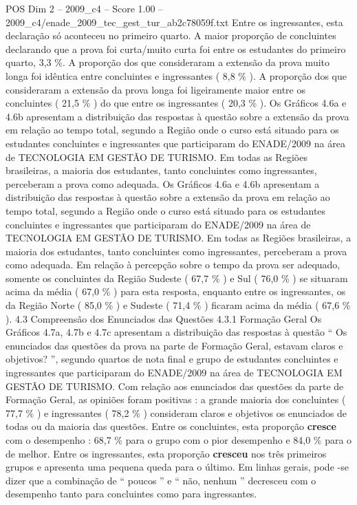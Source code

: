 \begin{textsample}{POS Dim 2 – 2009\_c4 – Score 1.00 – 2009\_c4/enade\_2009\_tec\_gest\_tur\_ab2c78059f.txt}
Entre os ingressantes, esta declaração só aconteceu no primeiro quarto.
A maior proporção de concluintes declarando que a prova foi curta/muito curta foi entre os estudantes do primeiro quarto, 3,3 \%.
A proporção dos que consideraram a extensão da prova muito longa foi idêntica entre concluintes e ingressantes ( 8,8 \% ).
A proporção dos que consideraram a extensão da prova longa foi ligeiramente maior entre os concluintes ( 21,5 \% ) do que entre os ingressantes ( 20,3 \% ).
Os Gráficos 4.6a e 4.6b apresentam a distribuição das respostas à questão sobre a extensão da prova em relação ao tempo total, segundo a Região onde o curso está situado para os estudantes concluintes e ingressantes que participaram do ENADE/2009 na área de TECNOLOGIA EM GESTÃO DE TURISMO.
Em todas as Regiões brasileiras, a maioria dos estudantes, tanto concluintes como ingressantes, perceberam a prova como adequada.
Os Gráficos 4.6a e 4.6b apresentam a distribuição das respostas à questão sobre a extensão da prova em relação ao tempo total, segundo a Região onde o curso está situado para os estudantes concluintes e ingressantes que participaram do ENADE/2009 na área de TECNOLOGIA EM GESTÃO DE TURISMO.
Em todas as Regiões brasileiras, a maioria dos estudantes, tanto concluintes como ingressantes, perceberam a prova como adequada.
Em relação à percepção sobre o tempo da prova ser adequado, somente os concluintes da Região Sudeste ( 67,7 \% ) e Sul ( 76,0 \% ) se situaram acima da média ( 67,0 \% ) para esta resposta, enquanto entre os ingressantes, os da Região Norte ( 85,0 \% ) e Sudeste ( 71,4 \% ) ficaram acima da média ( 67,6 \% ). 4.3 Compreensão dos Enunciados das Questões 4.3.1 Formação Geral Os Gráficos 4.7a, 4.7b e 4.7c apresentam a distribuição das respostas à questão “ Os enunciados das questões da prova na parte de Formação Geral, estavam claros e objetivos? ”, segundo quartos de nota final e grupo de estudantes concluintes e ingressantes que participaram do ENADE/2009 na área de TECNOLOGIA EM GESTÃO DE TURISMO.
Com relação aos enunciados das questões da parte de Formação Geral, as opiniões foram positivas : a grande maioria dos concluintes ( 77,7 \% ) e ingressantes ( 78,2 \% ) consideram claros e objetivos os enunciados de todas ou da maioria das questões.
Entre os concluintes, esta proporção \textbf{cresce} com o desempenho : 68,7 \% para o grupo com o pior desempenho e 84,0 \% para o de melhor.
Entre os ingressantes, esta proporção \textbf{cresceu} nos três primeiros grupos e apresenta uma pequena queda para o último.
Em linhas gerais, pode -se dizer que a combinação de “ poucos ” e “ não, nenhum ” decresceu com o desempenho tanto para concluintes como para ingressantes.

\end{textsample}
